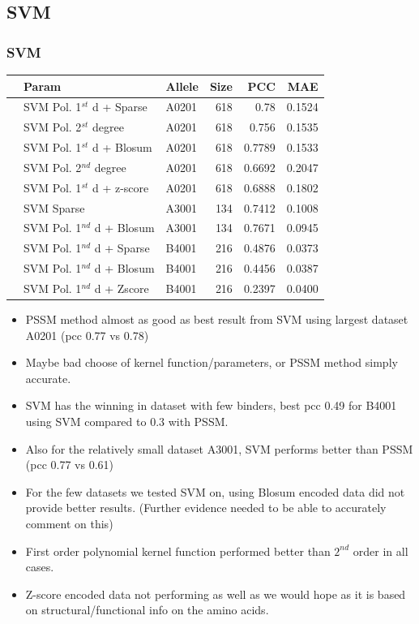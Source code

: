 \documentclass[presentation]{beamer}   %
\begin{document}
\subsection{SVM}
 \frametitle{SVM}
\begin{frame}
\begin{table}[ht]\scriptsize
\begin{center}
\begin{tabular}{rllrrr}
  \hline
 & Param & Allele & Size & PCC & MAE \\ 
  \hline
 & SVM Pol. 1$^{st}$ d + Sparse & A0201 &   618 & 0.78 & 0.1524 \\ 
 & SVM Pol. 2$^{st}$ degree & A0201 &   618 & 0.756 & 0.1535 \\ 
 & SVM Pol. 1$^{st}$ d + Blosum & A0201 &   618 & 0.7789 & 0.1533 \\ 
 & SVM Pol. 2$^{nd}$ degree & A0201 &   618 & 0.6692 & 0.2047 \\ 
 & SVM Pol. 1$^{st}$ d + z-score & A0201 &   618 & 0.6888 & 0.1802 \\ 
 & SVM Sparse & A3001 &   134 & 0.7412 & 0.1008 \\ 
 & SVM Pol. 1$^{nd}$ d + Blosum & A3001 &   134 & 0.7671 & 0.0945 \\ 
 & SVM Pol. 1$^{nd}$ d + Sparse & B4001 &   216 & 0.4876 & 0.0373 \\ 
 & SVM Pol. 1$^{nd}$ d + Blosum & B4001 &   216 & 0.4456 & 0.0387 \\ 
 & SVM Pol. 1$^{nd}$ d + Zscore & B4001 &   216 & 0.2397 & 0.0400 \\ 
   \hline
\end{tabular}
\end{center}
\end{table}
\end{frame}

\begin{frame}
\begin{itemize}
\item<1> PSSM method almost as good as best result from SVM using largest dataset A0201 (pcc 0.77 vs 0.78)
\item<2> Maybe bad choose of kernel function/parameters, or PSSM method simply accurate.
\item<3> SVM has the winning in dataset with few binders, best pcc 0.49 for B4001 using SVM compared to 0.3 with PSSM.
\item<4> Also for the relatively small dataset A3001, SVM performs better than PSSM (pcc 0.77 vs 0.61)
\item<5> For the few datasets we tested SVM on, using Blosum encoded data did not provide better results. (Further evidence needed to be able to accurately comment on this)
\item<6> First order polynomial kernel function performed better than $2^{nd}$ order in all cases.
\item<7> Z-score encoded data not performing as well as we would hope as it is based on structural/functional info on the amino acids.
\end{itemize}
\end{frame}
\end{document}
